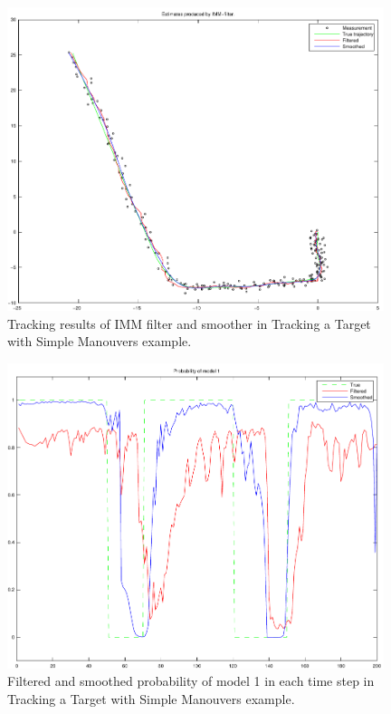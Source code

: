 \begin{figure}
\begin{center}
\includegraphics[width=11cm]{pics/imm3}
\caption{Tracking results of IMM filter and smoother in Tracking a
Target with Simple Manouvers example.}
\label{fig:imm_imm}
\end{center}
\end{figure}

\begin{figure}
\begin{center}
\includegraphics[width=11cm]{pics/imm4}
\caption{Filtered and smoothed probability of model 1 in each time
step in Tracking a Target with Simple Manouvers example.}
\label{fig:imm_model_probability}
\end{center}
\end{figure}

